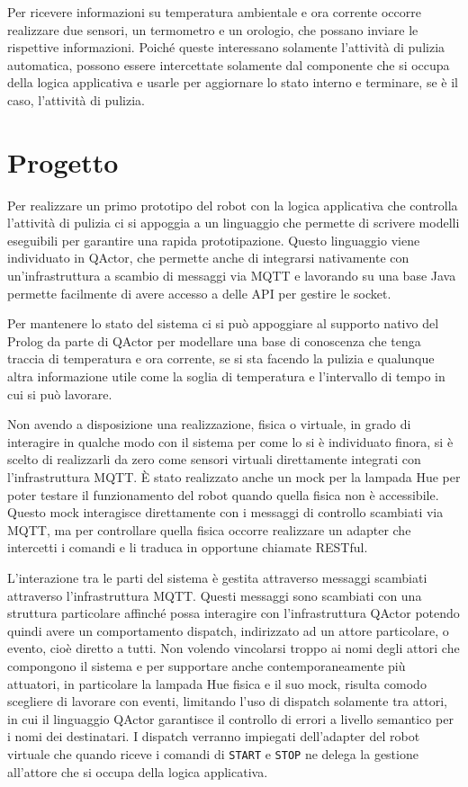 Per ricevere informazioni su temperatura ambientale e ora corrente occorre realizzare due sensori, un termometro e un orologio, che possano inviare le rispettive informazioni. Poiché queste interessano solamente l'attività di pulizia automatica, possono essere intercettate solamente dal componente che si occupa della logica applicativa e usarle per aggiornare lo stato interno e terminare, se è il caso, l'attività di pulizia.

\section{Progetto}
Per realizzare un primo prototipo del robot con la logica applicativa che controlla l'attività di pulizia ci si appoggia a un linguaggio che permette di scrivere modelli eseguibili per garantire una rapida prototipazione. Questo linguaggio viene individuato in QActor, che permette anche di integrarsi nativamente con un'infrastruttura a scambio di messaggi via MQTT e lavorando su una base Java permette facilmente di avere accesso a delle API per gestire le socket.

Per mantenere lo stato del sistema ci si può appoggiare al supporto nativo del Prolog da parte di QActor per modellare una base di conoscenza che tenga traccia di temperatura e ora corrente, se si sta facendo la pulizia e qualunque altra informazione utile come la soglia di temperatura e l'intervallo di tempo in cui si può lavorare.

Non avendo a disposizione una realizzazione, fisica o virtuale, in grado di interagire in qualche modo con il sistema per come lo si è individuato finora, si è scelto di realizzarli da zero come sensori virtuali direttamente integrati con l'infrastruttura MQTT. È stato realizzato anche un mock per la lampada Hue per poter testare il funzionamento del robot quando quella fisica non è accessibile. Questo mock interagisce direttamente con i messaggi di controllo scambiati via MQTT, ma per controllare quella fisica occorre realizzare un adapter che intercetti i comandi e li traduca in opportune chiamate RESTful.

L'interazione tra le parti del sistema è gestita attraverso messaggi scambiati attraverso l'infrastruttura MQTT. Questi messaggi sono scambiati con una struttura particolare affinché possa interagire con l'infrastruttura QActor potendo quindi avere un comportamento dispatch, indirizzato ad un attore particolare, o evento, cioè diretto a tutti. Non volendo vincolarsi troppo ai nomi degli attori che compongono il sistema e per supportare anche contemporaneamente più attuatori, in particolare la lampada Hue fisica e il suo mock, risulta comodo scegliere di lavorare con eventi, limitando l'uso di dispatch solamente tra attori, in cui il linguaggio QActor garantisce il controllo di errori a livello semantico per i nomi dei destinatari. I dispatch verranno impiegati dell'adapter del robot virtuale che quando riceve i comandi di \texttt{START} e \texttt{STOP} ne delega la gestione all'attore che si occupa della logica applicativa.

